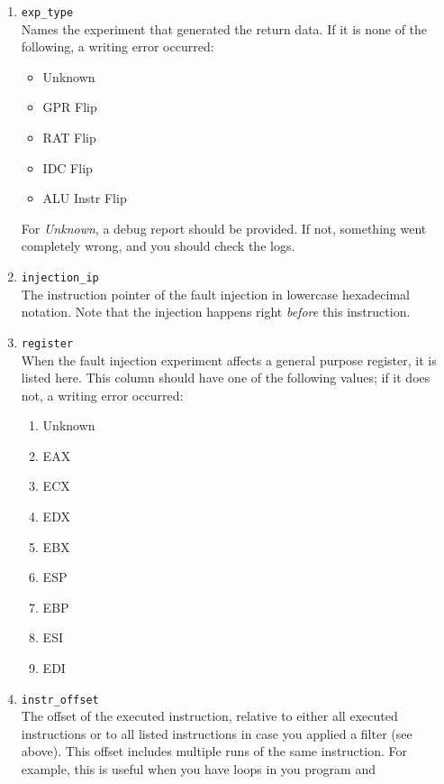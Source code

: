 \documentclass[a4paper,times,9pt]{article}
\begin{document}
\begin{enumerate}[topsep=0em,itemsep=0em]
 \item \verb+exp_type+\\
       Names the experiment that generated the return data.
       If it is none of the following, a writing error occurred:
       \begin{itemize}[itemsep=0em]
        \item Unknown
        \item GPR Flip
        \item RAT Flip
        \item IDC Flip
        \item ALU Instr Flip
       \end{itemize}
       For \emph{Unknown}, a debug report should be provided.
       If not, something went completely wrong, and you should
       check the logs.
 \item \verb+injection_ip+\\
       The instruction pointer of the fault injection
       in lowercase hexadecimal notation.
       Note that the injection happens right \emph{before} this
       instruction.
 \item \verb+register+\\
       When the fault injection experiment affects a general purpose register,
       it is listed here. This column should have one of the following values;
       if it does not, a writing error occurred:
       \begin{enumerate}[itemsep=0em]
        \item Unknown
        \item EAX
        \item ECX
        \item EDX
        \item EBX
        \item ESP
        \item EBP
        \item ESI
        \item EDI
       \end{enumerate}
 \item \verb+instr_offset+\\
       The offset of the executed instruction, relative to either all executed
       instructions or to all listed instructions in case you applied
       a filter (see above). This offset includes multiple runs of the same
       instruction.
       For example, this is useful when you have loops in you program and

\end{enumerate}
\end{document}
